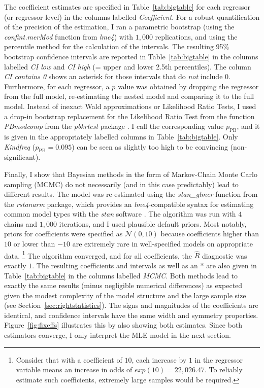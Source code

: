 \documentclass[USenglish]{article}
\newcommand{\mpPB}{\ensuremath{p_{\text{PB}}}}
\begin{document}
The coefficient estimates are specified in Table~\ref{tab:bigtable} for each regressor (or regressor level) in the columns labelled \textit{Coefficient}.
For a robust quantification of the precision of the estimation, I ran a parametric bootstrap (using the \mbox{\textit{confint.merMod}} function from \textit{lme4}) with $1,000$ replications, and using the percentile method for the calculation of the intervals.
The resulting 95\% bootstrap confidence intervals are reported in Table~\ref{tab:bigtable} in the columns labelled \textit{CI low} and \textit{CI high} (= upper and lower 2.5th percentiles).
The column \textit{CI contains 0} shows an asterisk for those intervals that do \textit{not} include $0$.
Furthermore, for each regressor, a $p$ value was obtained by dropping the regressor from the full model, re-estimating the nested model and comparing it to the full model.
Instead of inexact Wald approximations or Likelihood Ratio Tests, I used a drop-in bootstrap replacement for the Likelihood Ratio Test from the function \textit{PBmodcomp} from the \textit{pbkrtest} package \citep{HalekohHojsgaard2014}.
I call the corresponding value $p_{\text{PB}}$, and it is given in the appropriately labelled columns in Table~\ref{tab:bigtable}.
Only \textit{Kindfreq} ($\mpPB=0.095$) can be seen as slightly too high to be convincing (non-significant).

Finally, I show that Bayesian methods in the form of Markov-Chain Monte Carlo sampling (MCMC) do not necessarily (and in this case predictably) lead to different results.
The model was re-estimated using the \textit{stan\_glmer} function from the \textit{rstanarm} package, which provides an \textit{lme4}-compatible syntax for estimating common model types with the \textit{stan} software \citep{CarpenterEa2017}.
The algorithm was run with $4$ chains and $1,000$ iterations, and I used plausible default priors.
Most notably, priors for coefficients were specified as $\mathcal{N}(0,10)$ because coefficients higher than $10$ or lower than $-10$ are extremely rare in well-specified models on appropriate data.%
\footnote{Consider that with a coefficient of $10$, each increase by $1$ in the regressor variable means an increase in odds of $exp(10)=22,026.47$.
To reliably estimate such coefficients, extremely large samples would be required.}
The algorithm converged, and for all coefficients, the $\hat{R}$ diagnostic was exactly $1$.
The resulting coefficients and intervals as well as an * are also given in Table~\ref{tab:bigtable} in the columns labelled \textit{MCMC}.
Both methods lead to exactly the same results (minus negligible numerical differences) as expected given the modest complexity of the model structure and the large sample size (see Section~\ref{sec:rightstatistics}).
The signs and magnitudes of the coefficients are identical, and confidence intervals have the same width and symmetry properties.
Figure~\ref{fig:fixeffs} illustrates this by also showing both estimates.
Since both estimators converge, I only interpret the MLE model in the next section.
\end{document}
